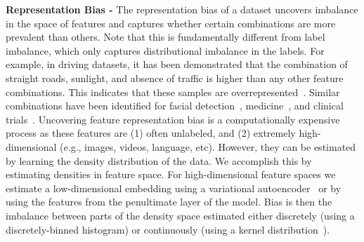\documentclass{article} %
\begin{document}
\textbf{Representation Bias - } 
%
The representation bias of a dataset uncovers imbalance in the space of features and captures whether certain combinations are more prevalent than others. Note that this is fundamentally different from label imbalance, which only captures distributional imbalance in the labels. For example, in driving datasets, it has been demonstrated that the combination of straight roads, sunlight, and absence of traffic is higher than any other feature combinations. This  indicates that these samples are overrepresented~\citep{amini2018variational}. Similar combinations have  been identified for facial detection~\citep{buolamwini2018gender, amini2019uncovering},  medicine~\citep{puyol2021fairness, soleimany2021evidential}, and clinical trials~\citep{xu2022identifying}. Uncovering feature representation bias is a computationally expensive process as these features are (1) often unlabeled, and (2) extremely high-dimensional (e.g., images, videos, language, etc). However, they can be estimated by learning the density distribution of the data. We accomplish this by estimating densities in feature space. For high-dimensional feature spaces we estimate a low-dimensional embedding using a variational autoencoder~\citep{kingma2013auto} or by using the features from the penultimate layer of the model. Bias is then the imbalance between parts of the density space estimated either discretely (using a discretely-binned histogram) or continuously (using a kernel distribution~\citep{rosenblatt1956remarks}). 
\end{document}
